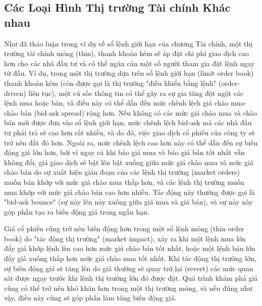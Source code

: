 \subsection{Các Loại Hình Thị trường Tài chính Khác nhau}

Như đã thảo luận trong ví dụ về sổ lệnh giới hạn của chương Tài chính, một thị trường tài chính mỏng (thin), thanh khoản kém sẽ áp đặt chi phí giao dịch cao hơn cho các nhà đầu tư và có thể ngăn cản một số người tham gia đặt lệnh ngay từ đầu. Ví dụ, trong một thị trường dựa trên sổ lệnh giới hạn (limit order book) thanh khoản kém (còn được gọi là thị trường "điều khiển bằng lệnh" (order-driven) liên tục), một cú sốc thông tin có thể gây ra sự gia tăng đột ngột các lệnh mua hoặc bán, và điều này có thể dẫn đến mức chênh lệch giá chào mua-chào bán (bid-ask spread) rộng hơn. Nếu không có các mức giá chào mua và chào bán mới được đưa vào sổ lệnh giới hạn, mức chênh lệch bid-ask mà các nhà đầu tư phải trả sẽ cao hơn rất nhiều, và do đó, việc giao dịch cổ phiếu của công ty sẽ trở nên đắt đỏ hơn. Ngoài ra, mức chênh lệch cao hơn này có thể dẫn đến sự biến động giá lớn hơn, bởi vì ngay cả khi báo giá mua và báo giá bán tốt nhất vẫn không đổi, giá giao dịch sẽ bật lên bật xuống giữa mức giá chào mua và mức giá chào bán do sự xuất hiện gián đoạn của các lệnh thị trường (market orders) muốn bán khớp với mức giá chào mua thấp hơn, và các lệnh thị trường muốn mua khớp với mức giá chào bán cao hơn nhiều. Tác động này thường được gọi là "bid-ask bounce" (sự nảy lên nảy xuống giữa giá mua và giá bán), và sự nảy này góp phần tạo ra biến động giá trong ngắn hạn.

Giá cổ phiếu cũng trở nên biến động hơn trong một sổ lệnh mỏng (thin order book) do "tác động thị trường" (market impact), xảy ra khi một lệnh mua lớn đẩy giá khớp lệnh lên cao hơn mức giá chào bán tốt nhất, hoặc một lệnh bán lớn đẩy giá xuống thấp hơn mức giá chào mua tốt nhất. Khi tác động thị trường lớn, sự biến động giá sẽ tăng lên do giá thường sẽ quay trở lại (revert) các mức quan sát được ngay trước khi lệnh thị trường lớn đó được đặt. Quá trình khám phá giá cũng có thể trở nên khó khăn hơn trong một thị trường mỏng, và nếu đúng như vậy, điều này cũng sẽ góp phần làm tăng biến động giá.

